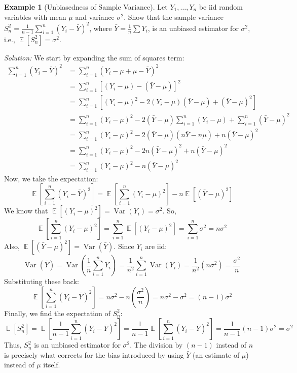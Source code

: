 \documentclass[11pt]{article}
\theoremstyle{definition}
\newtheorem{example}[theorem]{Example}
\theoremstyle{remark}
\DeclareMathOperator{\E}{\mathbb{E}}
\DeclareMathOperator{\Var}{\operatorname{Var}}
\begin{document}
\begin{example}[Unbiasedness of Sample Variance] \label{ex:unbiased_S2}
    Let $Y_1, \ldots, Y_n$ be iid random variables with mean $\mu$ and variance $\sigma^2$. Show that the sample variance $S_n^2 = \frac{1}{n-1} \sum_{i=1}^n (Y_i - \bar{Y})^2$, where $\bar{Y} = \frac{1}{n}\sum Y_i$, is an unbiased estimator for $\sigma^2$, i.e., $\E[S_n^2] = \sigma^2$.

    \emph{Solution:}
    We start by expanding the sum of squares term:
    \begin{align*} \sum_{i=1}^n (Y_i - \bar{Y})^2 &= \sum_{i=1}^n (Y_i - \mu + \mu - \bar{Y})^2 \\ &= \sum_{i=1}^n [(Y_i - \mu) - (\bar{Y} - \mu)]^2 \\ &= \sum_{i=1}^n [(Y_i - \mu)^2 - 2(Y_i - \mu)(\bar{Y} - \mu) + (\bar{Y} - \mu)^2] \\ &= \sum_{i=1}^n (Y_i - \mu)^2 - 2(\bar{Y} - \mu) \sum_{i=1}^n (Y_i - \mu) + \sum_{i=1}^n (\bar{Y} - \mu)^2 \\ &= \sum_{i=1}^n (Y_i - \mu)^2 - 2(\bar{Y} - \mu) (n\bar{Y} - n\mu) + n(\bar{Y} - \mu)^2 \\ &= \sum_{i=1}^n (Y_i - \mu)^2 - 2n(\bar{Y} - \mu)^2 + n(\bar{Y} - \mu)^2 \\ &= \sum_{i=1}^n (Y_i - \mu)^2 - n(\bar{Y} - \mu)^2 \end{align*}
    Now, we take the expectation:
    \[ \E\left[ \sum_{i=1}^n (Y_i - \bar{Y})^2 \right] = \E\left[ \sum_{i=1}^n (Y_i - \mu)^2 \right] - n \E\left[ (\bar{Y} - \mu)^2 \right] \]
    We know that $\E[(Y_i - \mu)^2] = \Var(Y_i) = \sigma^2$. So,
    \[ \E\left[ \sum_{i=1}^n (Y_i - \mu)^2 \right] = \sum_{i=1}^n \E[(Y_i - \mu)^2] = \sum_{i=1}^n \sigma^2 = n\sigma^2 \]
    Also, $\E[(\bar{Y} - \mu)^2] = \Var(\bar{Y})$. Since $Y_i$ are iid:
    \[ \Var(\bar{Y}) = \Var\left(\frac{1}{n}\sum_{i=1}^n Y_i\right) = \frac{1}{n^2} \sum_{i=1}^n \Var(Y_i) = \frac{1}{n^2} (n\sigma^2) = \frac{\sigma^2}{n} \]
    Substituting these back:
    \[ \E\left[ \sum_{i=1}^n (Y_i - \bar{Y})^2 \right] = n\sigma^2 - n\left(\frac{\sigma^2}{n}\right) = n\sigma^2 - \sigma^2 = (n-1)\sigma^2 \]
    Finally, we find the expectation of $S_n^2$:
    \[ \E[S_n^2] = \E\left[ \frac{1}{n-1} \sum_{i=1}^n (Y_i - \bar{Y})^2 \right] = \frac{1}{n-1} \E\left[ \sum_{i=1}^n (Y_i - \bar{Y})^2 \right] = \frac{1}{n-1} (n-1)\sigma^2 = \sigma^2 \]
    Thus, $S_n^2$ is an unbiased estimator for $\sigma^2$. The division by $(n-1)$ instead of $n$ is precisely what corrects for the bias introduced by using $\bar{Y}$ (an estimate of $\mu$) instead of $\mu$ itself.
\end{example}
\end{document}
